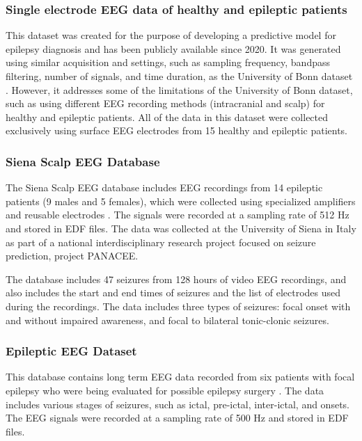 \subsubsection{Single electrode EEG data of healthy and epileptic patients}
This dataset was created for the purpose of developing a predictive model for epilepsy diagnosis and has been publicly available since 2020. It was generated using similar acquisition and settings, such as sampling frequency, bandpass filtering, number of signals, and time duration, as the University of Bonn dataset \cite{panwar_automated_2019, panwar_single_2020}. 
However, it addresses some of the limitations of the University of Bonn dataset, such as using different \gls{EEG} recording methods (intracranial and scalp) for healthy and epileptic patients. All of the data in this dataset were collected exclusively using surface \gls{EEG} electrodes from 15 healthy and epileptic patients.

\subsubsection{Siena Scalp EEG Database}
The Siena Scalp EEG database includes \gls{EEG} recordings from 14 epileptic patients (9 males and 5 females), which were collected using specialized amplifiers and reusable electrodes \cite{detti_eeg_2020, detti_paolo_siena_2020}. The signals were recorded at a sampling rate of 512 Hz and stored in \gls{EDF} files. The data was collected at the University of Siena in Italy as part of a national interdisciplinary research project focused on seizure prediction, project PANACEE. 

The database includes 47 seizures from 128 hours of video \gls{EEG} recordings, and also includes the start and end times of seizures and the list of electrodes used during the recordings. The data includes three types of seizures: focal onset with and without impaired awareness, and focal to bilateral tonic-clonic seizures.

\subsubsection{Epileptic EEG Dataset}
This database contains long term \gls{EEG} data recorded from six patients with focal epilepsy who were being evaluated for possible epilepsy surgery \cite{nasreddine_epileptic_2021}. The data includes various stages of seizures, such as ictal, pre-ictal, inter-ictal, and onsets. The \gls{EEG} signals were recorded at a sampling rate of 500 Hz and stored in \gls{EDF} files. 

